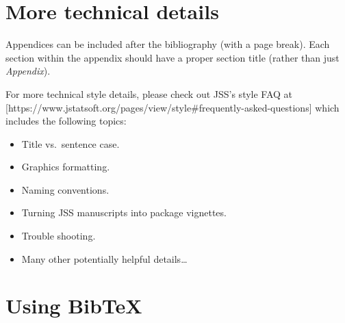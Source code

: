\documentclass[
  nojss,
  article]{jss}
\providecommand{\tightlist}{%
  \setlength{\itemsep}{0pt}\setlength{\parskip}{0pt}}
\begin{document}
\renewcommand{\bibsection}{}


\newpage{}

\section*{More technical details}\label{sec-techdetails}

\begin{tcolorbox}[enhanced jigsaw, colframe=quarto-callout-color-frame, colback=white, rightrule=.15mm, toprule=.15mm, breakable, arc=.35mm, bottomrule=.15mm, leftrule=.75mm, left=2mm, opacityback=0]

Appendices can be included after the bibliography (with a page break).
Each section within the appendix should have a proper section title
(rather than just \emph{Appendix}).

For more technical style details, please check out JSS's style FAQ at
{[}https://www.jstatsoft.org/pages/view/style\#frequently-asked-questions{]}
which includes the following topics:

\begin{itemize}
\tightlist
\item
  Title vs.~sentence case.
\item
  Graphics formatting.
\item
  Naming conventions.
\item
  Turning JSS manuscripts into  package vignettes.
\item
  Trouble shooting.
\item
  Many other potentially helpful details\ldots{}
\end{itemize}

\end{tcolorbox}

\section*{Using BibTeX}\label{sec-bibtex}
\end{document}
